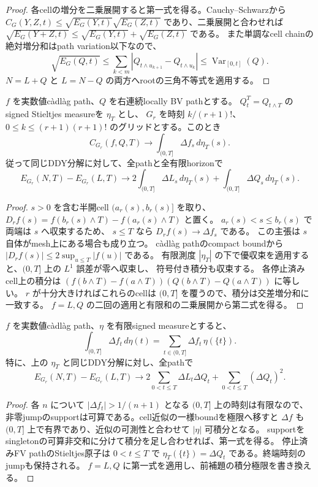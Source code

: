 \begin{proof}
各cellの増分を二乗展開すると第一式を得る。Cauchy--Schwarzから
$C_G(Y,Z,t)\leq\sqrt{E_G(Y,t)}\sqrt{E_G(Z,t)}$ であり、二乗展開と合わせれば
$\sqrt{E_G(Y+Z,t)}\leq\sqrt{E_G(Y,t)}+\sqrt{E_G(Z,t)}$ である。
また単調なcell chainの絶対増分和はpath variation以下なので、
\[
 \sqrt{E_G(Q,t)}\leq\sum_{k<m}|Q_{t\wedge u_{k+1}}-Q_{t\wedge u_k}|
    \leq\operatorname{Var}_{[0,t]}(Q).
\]
$N=L+Q$ と $L=N-Q$ の両方へrootの三角不等式を適用する。
\end{proof}

\begin{lemma}[階乗分割の交差項の積分極限]
$f$ を実数値càdlàg path、$Q$ を右連続locally BV pathとする。
$Q^T_t=Q_{t\wedge T}$ のsigned Stieltjes measureを $\eta_T$ とし、
$G_r$ を時刻 $k/(r+1)!$、$0\leq k\leq(r+1)(r+1)!$ のグリッドとする。このとき
\[
 C_{G_r}(f,Q,T)\longrightarrow\int_{(0,T]}\Delta f_s\,d\eta_T(s).
\]
従って同じDDY分解に対して、全pathと全有限horizonで
\[
 E_{G_r}(N,T)-E_{G_r}(L,T)
 \longrightarrow
 2\int_{(0,T]}\Delta L_s\,d\eta_T(s)+\int_{(0,T]}\Delta Q_s\,d\eta_T(s).
\]
\end{lemma}

\begin{proof}
$s>0$ を含む半開cell $(a_r(s),b_r(s)]$ を取り、
$D_r f(s)=f(b_r(s)\wedge T)-f(a_r(s)\wedge T)$ と置く。
$a_r(s)<s\leq b_r(s)$ で両端は $s$ へ収束するため、
$s\leq T$ なら $D_r f(s)\to\Delta f_s$ である。
この主張は $s$ 自体がmesh上にある場合も成り立つ。
càdlàg pathのcompact boundから $|D_r f(s)|\leq2\sup_{u\leq T}|f(u)|$ である。
有限測度 $|\eta_T|$ の下で優収束を適用すると、$(0,T]$ 上の $L^1$ 誤差が零へ収束し、
符号付き積分も収束する。
各停止済みcell上の積分は
$(f(b\wedge T)-f(a\wedge T))(Q(b\wedge T)-Q(a\wedge T))$ に等しい。
$r$ が十分大きければこれらのcellは $(0,T]$ を覆うので、積分は交差増分和に一致する。
$f=L,Q$ の二回の適用と有限和の二乗展開から第二式を得る。
\end{proof}

\begin{lemma}[jump積分の級数表示]
$f$ を実数値càdlàg path、$\eta$ を有限signed measureとすると、
\[
 \int_{(0,T]}\Delta f_t\,d\eta(t)
   =\sum_{t\in(0,T]}\Delta f_t\,\eta(\{t\}).
\]
特に、上の $\eta_T$ と同じDDY分解に対し、全pathで
\[
 E_{G_r}(N,T)-E_{G_r}(L,T)\longrightarrow
 2\sum_{0<t\leq T}\Delta L_t\Delta Q_t+\sum_{0<t\leq T}(\Delta Q_t)^2.
\]
\end{lemma}

\begin{proof}
各 $n$ について $|\Delta f_t|>1/(n+1)$ となる $(0,T]$ 上の時刻は有限なので、
非零jumpのsupportは可算である。cell近似の一様boundを極限へ移すと
$\Delta f$ も $(0,T]$ 上で有界であり、近似の可測性と合わせて $|\eta|$ 可積分となる。
supportをsingletonの可算非交和に分けて積分を足し合わせれば、第一式を得る。
停止済みFV pathのStieltjes原子は $0<t\leq T$ で
$\eta_T(\{t\})=\Delta Q_t$ である。終端時刻のjumpも保持される。
$f=L,Q$ に第一式を適用し、前補題の積分極限を書き換える。
\end{proof}

